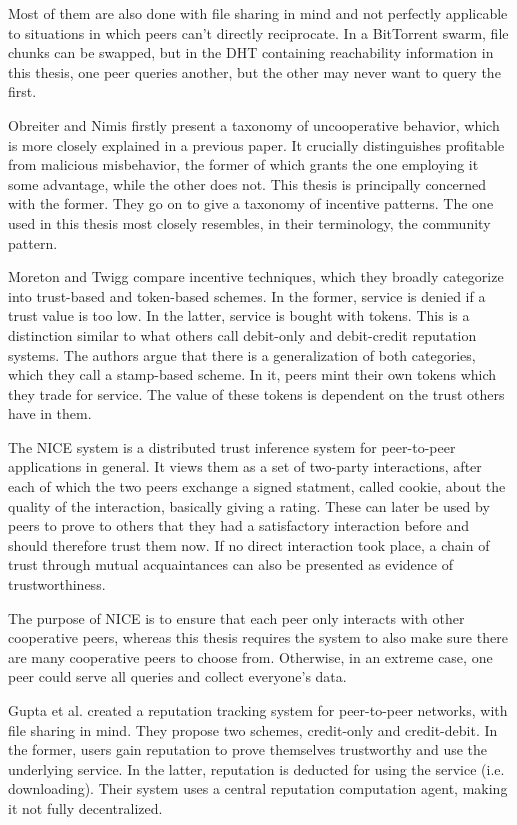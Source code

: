 Most of them are also done with file sharing in mind and not perfectly
applicable to situations in which peers can't directly reciprocate. In a
BitTorrent swarm, file chunks can be swapped, but in the DHT containing
reachability information in this thesis, one peer queries another, but the other
may never want to query the first.

Obreiter and Nimis\cite{obreiter2003taxonomy} firstly present a taxonomy of
uncooperative behavior, which is more closely explained in a previous
paper\cite{obreiter2003stimulating}. It crucially distinguishes profitable from
malicious misbehavior, the former of which grants the one employing it some
advantage, while the other does not. This thesis is principally concerned with
the former. They go on to give a taxonomy of incentive patterns. The one used in
this thesis most closely resembles, in their terminology, the community pattern.

Moreton and Twigg\cite{moreton2003trading} compare incentive techniques, which
they broadly categorize into trust-based and token-based schemes. In the former,
service is denied if a trust value is too low. In the latter, service is bought
with tokens. This is a distinction similar to what others call debit-only and
debit-credit reputation systems. The authors argue that there is a
generalization of both categories, which they call a stamp-based scheme. In it,
peers mint their own tokens which they trade for service. The value of these
tokens is dependent on the trust others have in them.

The NICE system\cite{sherwood2006cooperative} is a distributed trust inference
system for peer-to-peer applications in general. It views them as a set of
two-party interactions, after each of which the two peers exchange a signed
statment, called cookie, about the quality of the interaction, basically giving
a rating. These can later be used by peers to prove to others that they had a
satisfactory interaction before and should therefore trust them now. If no
direct interaction took place, a chain of trust through mutual acquaintances can
also be presented as evidence of trustworthiness.

The purpose of NICE is to ensure that each peer only interacts with other
cooperative peers, whereas this thesis requires the system to also make sure
there are many cooperative peers to choose from. Otherwise, in an extreme case,
one peer could serve all queries and collect everyone's data.

Gupta et al.\cite{gupta2003reputation} created a reputation tracking system for
peer-to-peer networks, with file sharing in mind. They propose two schemes,
credit-only and credit-debit. In the former, users gain reputation to prove
themselves trustworthy and use the underlying service. In the latter, reputation
is deducted for using the service (i.e. downloading). Their system uses a
central reputation computation agent, making it not fully decentralized.

